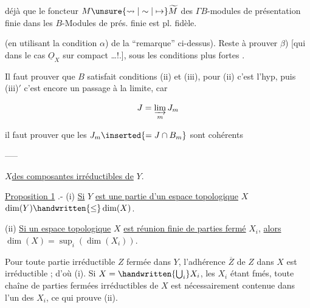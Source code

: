 déjà que le foncteur $M\unsure{\leadsto|\sim|\mapsto}\widetilde M$ des $\Gamma B$-modules de présentation finie dans les $B$-Modules de prés. finie est pl. fidèle.



(en utilisant  la condition $\alpha$) de la \textquotedblleft remarque\textquotedblright{} ci-dessus). Reste à prouver $\beta$) [qui  dans le cas $\underline O_X$  sur  compact \ldots !.], sous les conditions plus fortes .

Il faut prouver que $B$ satisfait conditions (ii) et (iii), pour (ii) c'est l'hyp, puis (iii)$'$ c'est encore un passage à la limite, car

\[
 J=\varinjlim_m J_m
\]

il faut prouver que les $J_m\inserted{=J\cap B_m}$ sont cohérents

-----

$X$\handwritten{\,}\uline{des composantes irréductibles de} $Y$.

\uline{Proposition 1} .- (i) \uline{Si} $Y$ \uline{est une partie d'un espace topologique} $X$ $\dim(Y)\handwritten{\leq}\dim(X)$.

(ii) \uline{Si un espace topologique} $X$ \uline{est réunion finie de parties fermé} $X_i$, \uline{alors} $\dim(X)=\sup_i(\dim(X_i))$.


Pour toute partie irréductible $Z$ fermée dans $Y$, l'adhérence $\overline Z$ de $Z$ dans $X$ est irréductible ; d'où (i). Si $X=\handwritten{\bigcup_i}X_i$, les $X_i$ étant fmés, toute chaîne de parties fermées irréductibles de $X$ est nécessairement contenue dans l'un des $X_i$, ce qui prouve (ii).

